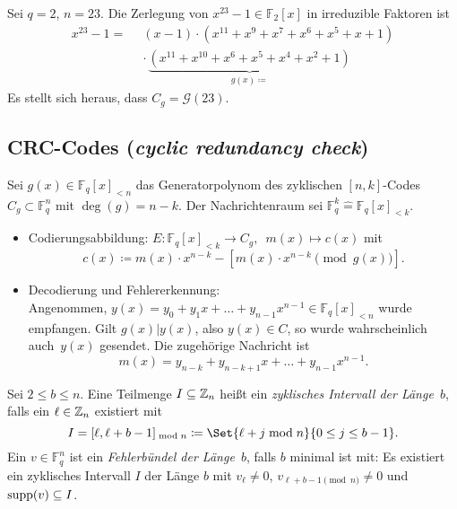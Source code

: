 \documentclass{cheat-sheet}
\newcommand{\F}{\mathbb{F}} %
\newcommand{\divides}{|} %
\newcommand{\Golay}{\mathcal{G}} %
\begin{document}
\begin{bsp}
  Sei $q = 2$, $n = 23$.
  Die Zerlegung von $x^{23} - 1 \in \F_2[x]$ in irreduzible Faktoren ist
  \begin{align*}
    x^{23} - 1 = \enspace & (x-1) \cdot (x^{11} + x^9 + x^7 + x^6 + x^5 + x + 1) \\
    & \cdot \, \underbrace{(x^{11} + x^{10} + x^6 + x^5 + x^4 + x^2 + 1)}_{g(x) \coloneqq}
  \end{align*}
  Es stellt sich heraus, dass $C_g = \Golay(23)$.
\end{bsp}

\subsection{CRC-Codes (\textit{cyclic redundancy check})}

\begin{verf}
  Sei $g(x) \in \F_q[x]_{< n}$ das Generatorpolynom des zyklischen $[n, k]$-Codes $C_g \subset \F_q^n$ mit $\deg(g) = n - k$.
  Der Nachrichtenraum sei $\F_q^k \hat{=} \F_q[x]_{< k}$.
  \begin{itemize}
    \item Codierungsabbildung: \enspace $E : \F_q[x]_{< k} \to C_g, \enspace m(x) \mapsto c(x)$ \enspace mit
    \[
      c(x) \coloneqq m(x) \cdot x^{n-k} - [ m(x) \cdot x^{n-k} \pmod{g(x)} ].
    \]
    \item Decodierung und Fehlererkennung: \\
    Angenommen, $y(x) = y_0 + y_1 x + \ldots + y_{n-1} x^{n-1} \in \F_q[x]_{< n}$ wurde empfangen.
    Gilt $g(x) \divides y(x)$, also $y(x) \in C$, so wurde wahrscheinlich auch~$y(x)$ gesendet.
    Die zugehörige Nachricht ist
    \[
      m(x) = y_{n-k} + y_{n-k+1} x + \ldots + y_{n-1} x^{n-1}.
    \]
  \end{itemize}
\end{verf}

\begin{defn}
  Sei $2 \leq b \leq n$.
  Eine Teilmenge $I \subseteq \mathbb{Z}_n$ heißt ein \emph{zyklisches Intervall der Länge~$b$}, falls ein $\ell \in \mathbb{Z}_n$ existiert mit
  \[
    I = [\ell, \ell + b - 1]_{\bmod n} \coloneqq \Set{\ell + j \bmod n}{0 \leq j \leq b-1}.
  \]
  Ein $v \in \F_q^n$ ist ein \emph{Fehlerbündel der Länge~$b$}, falls $b$ minimal ist mit:
  Es existiert ein zyklisches Intervall $I$ der Länge $b$ mit $v_\ell \neq 0$, $v_{\ell+b-1 \pmod{n}} \neq 0$ und $\operatorname{supp}(v) \subseteq I$.
\end{defn}
\end{document}
